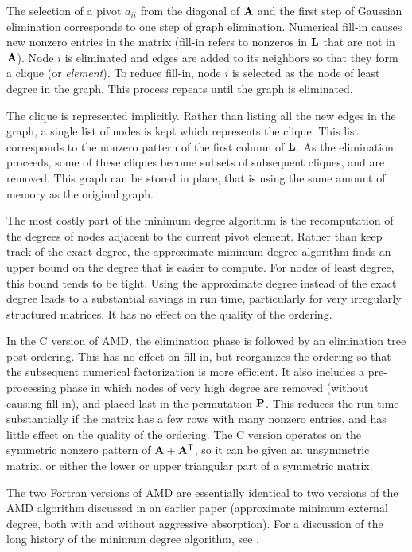 \documentclass[11pt]{article}
\newcommand{\m}[1]{{\bf{#1}}}       %
\newcommand{\tr}{^{\sf T}}          %
\begin{document}
The selection of a pivot $a_{ii}$ from the diagonal of $\m{A}$ and the first
step of Gaussian elimination corresponds to one step of graph elimination.
Numerical fill-in causes new nonzero entries in the matrix
(fill-in refers to
nonzeros in $\m{L}$ that are not in $\m{A}$).
Node $i$ is eliminated and edges are added to its neighbors
so that they form a clique (or {\em element}).  To reduce fill-in,
node $i$ is selected as the node of least degree in the graph.
This process repeats until the graph is eliminated.

The clique is represented implicitly.  Rather than listing all the
new edges in the graph, a single list of nodes is kept which represents
the clique.  This list corresponds to the nonzero pattern of the first
column of $\m{L}$.  As the elimination proceeds, some of these cliques
become subsets of subsequent cliques, and are removed.   This graph
can be stored in place, that is
using the same amount of memory as the original graph.

The most costly part of the minimum degree algorithm is the recomputation
of the degrees of nodes adjacent to the current pivot element.
Rather than keep track of the exact degree, the approximate minimum degree
algorithm finds an upper bound on the degree that is easier to compute.
For nodes of least degree, this bound tends to be tight.  Using the
approximate degree instead of the exact degree leads to a substantial savings
in run time, particularly for very irregularly structured matrices.
It has no effect on the quality of the ordering.

In the C version of AMD, the elimination phase is followed by an
elimination tree post-ordering.  This has no effect on fill-in, but
reorganizes the ordering so that the subsequent numerical factorization is
more efficient.  It also includes a pre-processing phase in which nodes of
very high degree are removed (without causing fill-in), and placed last in the
permutation $\m{P}$.  This reduces the run time substantially if the matrix
has a few rows with many nonzero entries, and has little effect on the quality
of the ordering.
The C version operates on the
symmetric nonzero pattern of $\m{A}+\m{A}\tr$, so it can be given
an unsymmetric matrix, or either the lower or upper triangular part of
a symmetric matrix.

The two Fortran versions of AMD are essentially identical to two versions of
the AMD algorithm discussed in an earlier paper \cite{AmestoyDavisDuff96}
(approximate minimum external degree, both with and without aggressive
absorption).
For a discussion of the long history of the minimum degree algorithm,
see \cite{GeorgeLiu89}.
\end{document}
